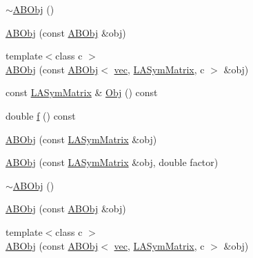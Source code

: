 \begin{DoxyCompactItemize}
\item 
\mbox{\hyperlink{classROOT_1_1Minuit2_1_1ABObj_3_01sym_00_01LASymMatrix_00_01double_01_4_a42b0b36ac55162609ddc385b3631cb6b}{$\sim$\+A\+B\+Obj}} ()
\item 
\mbox{\hyperlink{classROOT_1_1Minuit2_1_1ABObj_3_01sym_00_01LASymMatrix_00_01double_01_4_ad172181f07e897f45d1fe0d7954bb03b}{A\+B\+Obj}} (const \mbox{\hyperlink{classROOT_1_1Minuit2_1_1ABObj}{A\+B\+Obj}} \&obj)
\item 
{\footnotesize template$<$class c $>$ }\\\mbox{\hyperlink{classROOT_1_1Minuit2_1_1ABObj_3_01sym_00_01LASymMatrix_00_01double_01_4_a2632d99f281d85d56d8cd843e58eeac8}{A\+B\+Obj}} (const \mbox{\hyperlink{classROOT_1_1Minuit2_1_1ABObj}{A\+B\+Obj}}$<$ \mbox{\hyperlink{classROOT_1_1Minuit2_1_1vec}{vec}}, \mbox{\hyperlink{classROOT_1_1Minuit2_1_1LASymMatrix}{L\+A\+Sym\+Matrix}}, c $>$ \&obj)
\item 
const \mbox{\hyperlink{classROOT_1_1Minuit2_1_1LASymMatrix}{L\+A\+Sym\+Matrix}} \& \mbox{\hyperlink{classROOT_1_1Minuit2_1_1ABObj_3_01sym_00_01LASymMatrix_00_01double_01_4_a8caec6ce565f8d3729c663088d40233e}{Obj}} () const
\item 
double \mbox{\hyperlink{classROOT_1_1Minuit2_1_1ABObj_3_01sym_00_01LASymMatrix_00_01double_01_4_ad664e57b0a6720ab9c267c662c76b78f}{f}} () const
\item 
\mbox{\hyperlink{classROOT_1_1Minuit2_1_1ABObj_3_01sym_00_01LASymMatrix_00_01double_01_4_a22738586c6027ada2234556dbab7d406}{A\+B\+Obj}} (const \mbox{\hyperlink{classROOT_1_1Minuit2_1_1LASymMatrix}{L\+A\+Sym\+Matrix}} \&obj)
\item 
\mbox{\hyperlink{classROOT_1_1Minuit2_1_1ABObj_3_01sym_00_01LASymMatrix_00_01double_01_4_a85558830240c4e85aadec196587fe8e5}{A\+B\+Obj}} (const \mbox{\hyperlink{classROOT_1_1Minuit2_1_1LASymMatrix}{L\+A\+Sym\+Matrix}} \&obj, double factor)
\item 
\mbox{\hyperlink{classROOT_1_1Minuit2_1_1ABObj_3_01sym_00_01LASymMatrix_00_01double_01_4_a42b0b36ac55162609ddc385b3631cb6b}{$\sim$\+A\+B\+Obj}} ()
\item 
\mbox{\hyperlink{classROOT_1_1Minuit2_1_1ABObj_3_01sym_00_01LASymMatrix_00_01double_01_4_ad172181f07e897f45d1fe0d7954bb03b}{A\+B\+Obj}} (const \mbox{\hyperlink{classROOT_1_1Minuit2_1_1ABObj}{A\+B\+Obj}} \&obj)
\item 
{\footnotesize template$<$class c $>$ }\\\mbox{\hyperlink{classROOT_1_1Minuit2_1_1ABObj_3_01sym_00_01LASymMatrix_00_01double_01_4_a2632d99f281d85d56d8cd843e58eeac8}{A\+B\+Obj}} (const \mbox{\hyperlink{classROOT_1_1Minuit2_1_1ABObj}{A\+B\+Obj}}$<$ \mbox{\hyperlink{classROOT_1_1Minuit2_1_1vec}{vec}}, \mbox{\hyperlink{classROOT_1_1Minuit2_1_1LASymMatrix}{L\+A\+Sym\+Matrix}}, c $>$ \&obj)

\end{DoxyCompactItemize}
